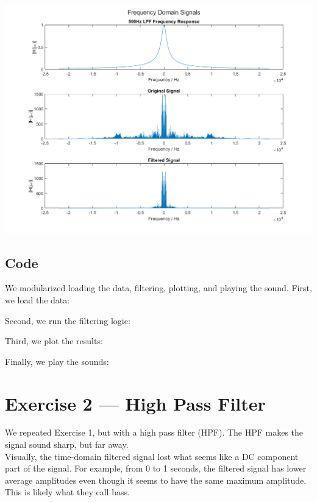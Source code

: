 \documentclass[11pt]{article}
\begin{document}
\includegraphics[height=0.5\textheight]{lpf_frequency.png}

\subsection{Code}
We modularized loading the data, filtering, plotting, and playing the sound.
First, we load the data:



Second, we run the filtering logic:



Third, we plot the results:



Finally, we play the sounds:



\section{Exercise 2 --- High Pass Filter}

We repeated Exercise 1, but with a high pass filter (HPF).
The HPF makes the signal sound sharp, but far away.\\

Visually, the time-domain filtered signal lost
what seems like a DC component part of the signal.
For example, from 0 to 1 seconds, the filtered signal has lower
average amplitudes even though it seems to have the same maximum amplitude.
This is likely what they call bass.\\
\end{document}
